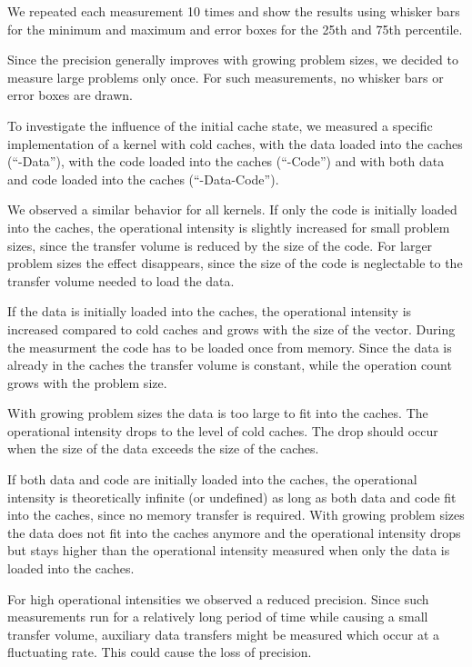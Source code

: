 \documentclass[a4paper,12pt]{article}
\begin{document}
We repeated each measurement 10 times and show the results using whisker bars
for the minimum and maximum and error boxes for the 25th and 75th percentile. 

Since the precision generally improves with growing problem sizes, we decided to
measure large problems only once. For such measurements, no whisker bars or
error boxes are drawn.

To investigate the influence of the initial cache state, we measured a specific
implementation of a kernel with cold caches, with the data loaded into the
caches (``-Data''), with the code loaded into the caches (``-Code'') and with
both data and code loaded into the caches (``-Data-Code'').

We observed a similar behavior for all kernels. If only the code is initially
loaded into the caches, the operational intensity is slightly increased for
small problem sizes, since the transfer volume is reduced by the size of the
code. For larger problem sizes the effect disappears, since the size of
the code is neglectable to the transfer volume needed to load the data.

If the data is initially loaded into the caches, the operational intensity is
increased compared to cold caches and grows with the size of the vector.
During the measurment the code has to be loaded once from memory.
Since the data is already in the caches the transfer volume is constant, while
the operation count grows with the problem size.

With growing problem sizes the data is too large to fit into the caches.
The operational intensity drops to the level of cold caches. The drop should
occur when the size of the data exceeds the size of the caches.

If both data and code are initially loaded into the caches, the operational
intensity is theoretically infinite (or undefined) as long as both data and
code fit into the caches, since no memory transfer is required. With growing
problem sizes the data does not fit into the caches anymore and the operational
intensity drops but stays higher than the operational intensity measured when
only the data is loaded into the caches.

For high operational intensities we observed a reduced precision. Since such
measurements run for a relatively long period of time while causing a small
transfer volume, auxiliary data transfers might be measured which occur at a
fluctuating rate. This could cause the loss of precision.
\end{document}
